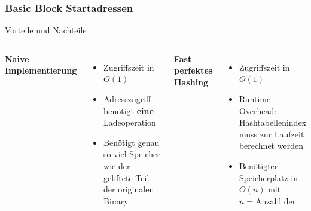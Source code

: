\begin{frame}
    \frametitle{Basic Block Startadressen}{Vorteile und Nachteile}
    \vspace{1cm}
    \begin{columns}[t]
        \textbf{Naive Implementierung}
        \begin{itemize}
            \vspace{1em}
            \setlength{\itemsep}{1em}
            \item Zugriffszeit in $O(1)$
            \item Adresszugriff benötigt \textbf{eine} Ladeoperation
            \item Benötigt genau so viel Speicher wie der geliftete Teil der originalen Binary
        \end{itemize}
        \textbf{Fast perfektes Hashing}
        \begin{itemize}
            \vspace{1em}
            \setlength{\itemsep}{1em}
            \item Zugriffszeit in $O(1)$
            \item Runtime Overhead: Hashtabellenindex muss zur Laufzeit berechnet werden
            \item Benötigter Speicherplatz in $O(n)$ mit $n = \text{Anzahl der Startadressen}$
        \end{itemize}
    \end{columns}
\end{frame}
\clearpage

